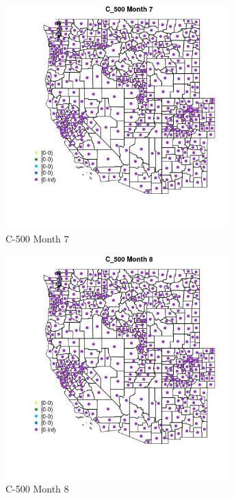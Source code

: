 \begin{figure} 
\centering  
\includegraphics[width=0.77\textwidth]{Code_Outputs/df_report_ML_predictors_CountyCentroid_Locations_Dates_2008-01-01to2018-12-31_MapObsMo7C_500.jpg} 
\caption{\label{fig:df_report_ML_predictors_CountyCentroid_Locations_Dates_2008-01-01to2018-12-31MapObsMo7C_500}C-500 Month 7} 
\end{figure} 
 

\clearpage 

\begin{figure} 
\centering  
\includegraphics[width=0.77\textwidth]{Code_Outputs/df_report_ML_predictors_CountyCentroid_Locations_Dates_2008-01-01to2018-12-31_MapObsMo8C_500.jpg} 
\caption{\label{fig:df_report_ML_predictors_CountyCentroid_Locations_Dates_2008-01-01to2018-12-31MapObsMo8C_500}C-500 Month 8} 
\end{figure} 
 

